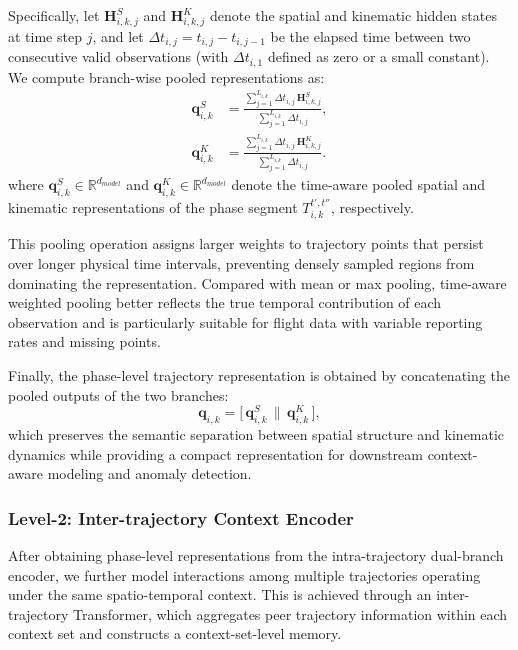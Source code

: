 \documentclass[iicol,pdflatex,sn-basic,Numbered]{sn-jnl}%
\theoremstyle{thmstyleone}%
\theoremstyle{thmstyletwo}%
\theoremstyle{thmstylethree}%
\begin{document}
Specifically, let $\mathbf{H}_{i,k,j}^S$ and $\mathbf{H}_{i,k,j}^K$ denote the spatial and kinematic hidden states at time step $j$, and let $\Delta t_{i,j} = t_{i,j} - t_{i,j-1}$ be the elapsed time between two consecutive valid observations (with $\Delta t_{i,1}$ defined as zero or a small constant).
We compute branch-wise pooled representations as:
\begin{equation}
\label{eq:segment_pool}
\begin{aligned}
\mathbf{q}_{i,k}^S &=
\frac{\sum\limits_{j=1}^{L_{i,k}} \Delta t_{i,j}\,\mathbf{H}_{i,k,j}^S}
{\sum\limits_{j=1}^{L_{i,k}} \Delta t_{i,j}},\\
\mathbf{q}_{i,k}^K &=
\frac{\sum\limits_{j=1}^{L_{i,k}} \Delta t_{i,j}\,\mathbf{H}_{i,k,j}^K}
{\sum\limits_{j=1}^{L_{i,k}} \Delta t_{i,j}}.
\end{aligned}
\end{equation}
where $\mathbf{q}_{i,k}^S \in \mathbb{R}^{d_{model}}$ and $\mathbf{q}_{i,k}^K \in \mathbb{R}^{d_{model}}$ denote the time-aware pooled spatial and kinematic representations of the phase segment $T^{t',t''}_{i,k}$, respectively.

This pooling operation assigns larger weights to trajectory points that persist over longer physical time intervals, preventing densely sampled regions from dominating the representation.
Compared with mean or max pooling, time-aware weighted pooling better reflects the true temporal contribution of each observation and is particularly suitable for flight data with variable reporting rates and missing points.

Finally, the phase-level trajectory representation is obtained by concatenating the pooled outputs of the two branches:
\begin{equation}
\mathbf{q}_{i,k} = \big[\,\mathbf{q}_{i,k}^S \,\|\, \mathbf{q}_{i,k}^K\,\big],
\end{equation}
which preserves the semantic separation between spatial structure and kinematic dynamics while providing a compact representation for downstream context-aware modeling and anomaly detection.

\subsubsection{Level-2: Inter-trajectory Context Encoder}

After obtaining phase-level representations from the intra-trajectory dual-branch encoder, we further model interactions among multiple trajectories operating under the same spatio-temporal context. This is achieved through an inter-trajectory Transformer, which aggregates peer trajectory information within each context set and constructs a context-set-level memory.
\end{document}
